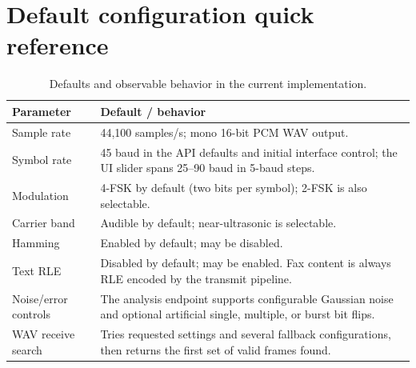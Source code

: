 \documentclass[11pt,a4paper]{article}
\begin{document}
\appendix
\section{Default configuration quick reference}
\label{app:defaults}
\begin{table}[ht]
\centering
\begin{tabularx}{\textwidth}{@{}lX@{}}
\toprule
\textbf{Parameter} & \textbf{Default / behavior} \\
\midrule
Sample rate & 44,100 samples/s; mono 16-bit PCM WAV output. \\
Symbol rate & 45 baud in the API defaults and initial interface control; the UI slider spans 25--90 baud in 5-baud steps. \\
Modulation & 4-FSK by default (two bits per symbol); 2-FSK is also selectable. \\
Carrier band & Audible by default; near-ultrasonic is selectable. \\
Hamming & Enabled by default; may be disabled. \\
Text RLE & Disabled by default; may be enabled. Fax content is always RLE encoded by the transmit pipeline. \\
Noise/error controls & The analysis endpoint supports configurable Gaussian noise and optional artificial single, multiple, or burst bit flips. \\
WAV receive search & Tries requested settings and several fallback configurations, then returns the first set of valid frames found. \\
\bottomrule
\end{tabularx}
\caption{Defaults and observable behavior in the current implementation.}
\end{table}
\end{document}

